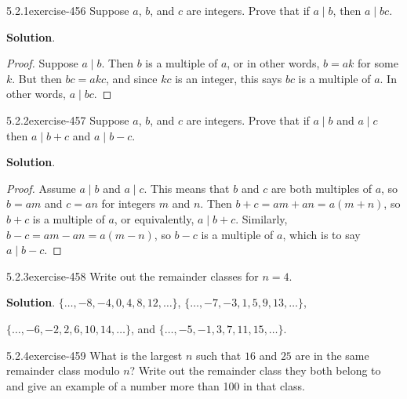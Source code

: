 \documentclass[twoside,11pt,]{book}
\numberwithin{equation}{chapter}
\begin{document}
\par\smallskip
\begin{divisionsolution}{5.2.1}{}{exercise-456}%
\hypertarget{p-5268}{}%
Suppose \(a\), \(b\), and \(c\) are integers. Prove that if \(a \mid b\), then \(a \mid bc\).%
\par\smallskip%
\noindent\textbf{Solution}.\quad%
\begin{proof}{}
\hypertarget{p-5269}{}%
Suppose \(a \mid b\). Then \(b\) is a multiple of \(a\), or in other words, \(b = ak\) for some \(k\). But then \(bc = akc\), and since \(kc\) is an integer, this says \(bc\) is a multiple of \(a\). In other words, \(a \mid bc\).%
\end{proof}
\end{divisionsolution}%
\begin{divisionsolution}{5.2.2}{}{exercise-457}%
\hypertarget{p-5270}{}%
Suppose \(a\), \(b\), and \(c\) are integers. Prove that if \(a \mid b\) and \(a \mid c\) then \(a \mid b+c\) and \(a \mid b-c\).%
\par\smallskip%
\noindent\textbf{Solution}.\quad%
\begin{proof}{}
\hypertarget{p-5271}{}%
Assume \(a \mid b\) and \(a \mid c\). This means that \(b\) and \(c\) are both multiples of \(a\), so \(b = am\) and \(c = an\) for integers \(m\) and \(n\). Then \(b+c = am+an = a(m+n)\), so \(b+c\) is a multiple of \(a\), or equivalently, \(a \mid b+c\). Similarly, \(b-c = am-an = a(m-n)\), so \(b-c\) is a multiple of \(a\), which is to say \(a \mid b-c\).%
\end{proof}
\end{divisionsolution}%
\begin{divisionsolution}{5.2.3}{}{exercise-458}%
\hypertarget{p-5272}{}%
Write out the remainder classes for \(n = 4\).%
\par\smallskip%
\noindent\textbf{Solution}.\quad%
\hypertarget{p-5273}{}%
\(\{\ldots, -8, -4, 0, 4, 8, 12, \ldots\}\), \(\{\ldots, -7, -3, 1, 5, 9, 13, \ldots\}\),%
\par
\hypertarget{p-5274}{}%
\(\{\ldots, -6, -2, 2, 6, 10, 14, \ldots\}\), and \(\{\ldots, -5, -1, 3, 7, 11, 15, \ldots\}\).%
\end{divisionsolution}%
\begin{divisionsolution}{5.2.4}{}{exercise-459}%
\hypertarget{p-5275}{}%
What is the largest \(n\) such that \(16\) and \(25\) are in the same remainder class modulo \(n\)?  Write out the remainder class they both belong to and give an example of a number more than 100 in that class.%
\end{divisionsolution}%
\end{document}
